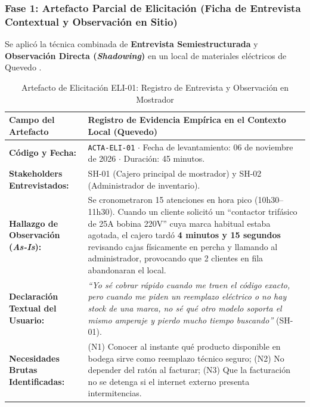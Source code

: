 \subsubsection{Fase 1: Artefacto Parcial de Elicitación (Ficha de Entrevista Contextual y Observación en Sitio)}
Se aplicó la técnica combinada de \textbf{Entrevista Semiestructurada} y \textbf{Observación Directa (\textit{Shadowing})} en un local de materiales eléctricos de Quevedo \cite{pohl2025, wiegers2013}.
\begin{table}[htbp]
	\centering
	\scriptsize
	\caption{Artefacto de Elicitación ELI-01: Registro de Entrevista y Observación en Mostrador}
	\label{tab:artefacto_elicitacion}
	\begin{tabularx}{\textwidth}{>{\raggedright\arraybackslash}p{} Y}
		\toprule
		\textbf{Campo del Artefacto} & \textbf{Registro de Evidencia Empírica en el Contexto Local (Quevedo)} \\
		\midrule
		\textbf{Código y Fecha:} & \texttt{ACTA-ELI-01} $\cdot$ Fecha de levantamiento: 06 de noviembre de 2026 $\cdot$ Duración: 45 minutos. \\
		\textbf{Stakeholders Entrevistados:} & SH-01 (Cajero principal de mostrador) y SH-02 (Administrador de inventario). \\
		\textbf{Hallazgo de Observación (\textit{As-Is}):} & Se cronometraron 15 atenciones en hora pico (10h30--11h30). Cuando un cliente solicitó un ``contactor trifásico de 25A bobina 220V'' cuya marca habitual estaba agotada, el cajero tardó \textbf{4 minutos y 15 segundos} revisando cajas físicamente en percha y llamando al administrador, provocando que 2 clientes en fila abandonaran el local. \\
		\textbf{Declaración Textual del Usuario:} & \textit{``Yo sé cobrar rápido cuando me traen el código exacto, pero cuando me piden un reemplazo eléctrico o no hay stock de una marca, no sé qué otro modelo soporta el mismo amperaje y pierdo mucho tiempo buscando''} (SH-01). \\
		\textbf{Necesidades Brutas Identificadas:} & (N1) Conocer al instante qué producto disponible en bodega sirve como reemplazo técnico seguro; (N2) No depender del ratón al facturar; (N3) Que la facturación no se detenga si el internet externo presenta intermitencias. \\
		\bottomrule
	\end{tabularx}
\end{table}
